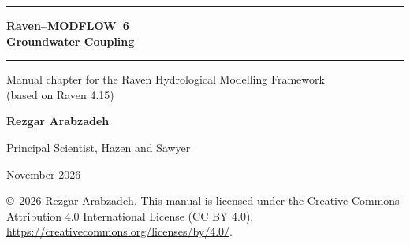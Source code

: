 \documentclass[11pt,a4paper]{report}
\begin{document}
\begin{titlepage}
\centering
\vspace*{3.5cm}
{\color{brand}\rule{\linewidth}{1.2pt}}\par\vspace{16pt}
{\sffamily\bfseries\fontsize{30}{38}\selectfont\color{brand}Raven--MODFLOW~6\\[4pt]Groundwater Coupling\par}
\vspace{14pt}
{\color{brand}\rule{\linewidth}{1.2pt}}\par\vspace{24pt}
{\large Manual chapter for the Raven Hydrological Modelling Framework\\[2pt](based on Raven 4.15)\par}
\vfill
{\sffamily\Large\bfseries Rezgar Arabzadeh\par}
\vspace{4pt}
{\large Principal Scientist, Hazen and Sawyer\par}
\vspace{2cm}
{\large November 2026\par}
\vspace{1.2cm}
{\footnotesize\color{gray!70!black}\copyright\ 2026 Rezgar Arabzadeh. This manual is licensed under the Creative Commons Attribution 4.0
International License (CC BY 4.0), \url{https://creativecommons.org/licenses/by/4.0/}.\par}
\end{titlepage}
\begingroup\small\tableofcontents\endgroup
\cleardoublepage
{}










\appendix

\cleardoublepage{}


\end{document}

